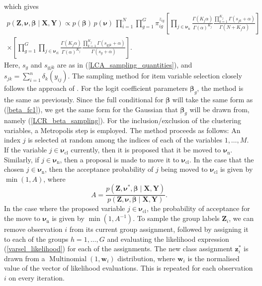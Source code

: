 \documentclass[11pt]{article}
\def\Mult{\operatorname{Multinomial}}
\def\cl{\operatorname{cl}}
\def\nsub{\operatorname{n}}
\def\boldw{\mathbf{w}}
\def\boldz{\mathbf{z}}
\def\boldX{\mathbf{X}}
\def\boldY{\mathbf{Y}}
\def\boldZ{\mathbf{Z}}
\def\bsbet{\boldsymbol{\beta}}
\def\bsnu{\boldsymbol{\nu}}
\theoremstyle{plain}
\theoremstyle{definition}
\begin{document}
which gives 
\begin{multline}\label{varsel_likelihood}
p(\boldZ, \bsnu, \bsbet \mid \boldX, \boldY) \propto p(\bsbet)\,p(\bsnu)\,\prod_{i=1}^N \prod_{g=1}^G 
\pi_{ig}^{z_{ig}} \left[ \prod_{j\in \bsnu_{\nsub}} \frac{\Gamma(K_j \alpha)}{\Gamma(\alpha)^{K_j}} \frac{\prod_{k=1}^{K_j} \Gamma(s_{jk} + \alpha)}{\Gamma(N + K_j\alpha)}\right]\\ \times \left[ \prod_{g=1}^G \prod_{j \in \bsnu_{\cl}} \frac{\Gamma(K_j \alpha)}{\Gamma(\alpha)^{K_j}}\frac{\prod_{k=1}^{K_j}\Gamma(s_{gjk} + \alpha)}{\Gamma(s_g + \alpha)} \right].
\end{multline}
Here, $s_g$ and $s_{gjk}$ are as in (\ref{LCA_sampling_quantities}), and $s_{jk} = \sum_{i=1}^n \delta_k(y_{ij})$. The sampling method for item variable selection closely follows the approach of \cite{white_bayesian_2016}. For the logit coefficient parameters $\bsbet_g$, the method is the same as previously. Since the full conditional for $\bsbet$ will take the same form as (\ref{beta_fc1}), we get the same form for the Gaussian that $\bsbet_g$ will be drawn from, namely (\ref{LCR_beta_sampling}). For the inclusion/exclusion of the clustering variables, a Metropolis step is employed. The method proceeds as follows: An index $j$ is selected at random among the indices of each of the variables $1,\dots,M$. If the variable $j \in \bsnu_{\cl}$ currently, then it is proposed that it be moved to $\bsnu_{\nsub}$. Similarly, if $j \in \bsnu_{\nsub}$, then a proposal is made to move it to $\bsnu_{\cl}$. In the case that the chosen $j \in \bsnu_{\nsub}$, then the acceptance probability of $j$ being moved to $\bsnu_{\cl}$ is given by $\min(1,A)$, where
\[
    A = \frac{p(\boldZ, \bsnu^*, \bsbet \mid \boldX, \boldY)}{p(\boldZ, \bsnu, \bsbet \mid \boldX, \boldY)}.
\]
In the case where the proposed variable $j \in \bsnu_{\cl}$, the probability of acceptance for the move to $\bsnu_{\nsub}$ is given by $\min(1,A^{-1})$. To sample the group labels $\boldZ_i$, we can remove observation $i$ from its current group assignment, followed by assigning it to each of the groups $h = 1,\dots,G$ and evaluating the likelihood expression (\ref{varsel_likelihood}) for each of the assignments. 
The new class assignment $\boldz_i^*$ is drawn from a $\Mult(1,\boldw_i)$ distribution, where $\boldw_i$ is the normalised value of the vector of likelihood evaluations. This is repeated for each observation $i$ on every iteration.
\end{document}
